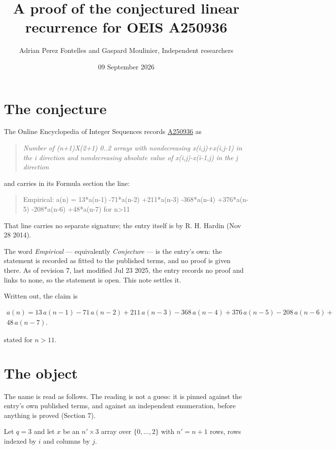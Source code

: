 \documentclass[11pt]{article}
\title{A proof of the conjectured linear recurrence for OEIS A250936}
\author{Adrian Perez Fontelles and Gaspard Moulinier, Independent researchers}
\date{09 September 2026}
\theoremstyle{definition}
\begin{document}
\maketitle
\section{The conjecture}

The Online Encyclopedia of Integer Sequences records \href{https://oeis.org/A250936}{A250936} as

\begin{quote}\itshape Number of (n+1)X(2+1) 0..2 arrays with nondecreasing x(i,j)+x(i,j-1) in the i direction and nondecreasing absolute value of x(i,j)-x(i-1,j) in the j direction\end{quote}

and carries in its Formula section the line:

\begin{quote}\ttfamily Empirical: a(n) = 13*a(n-1) -71*a(n-2) +211*a(n-3) -368*a(n-4) +376*a(n-5) -208*a(n-6) +48*a(n-7) for n>11\end{quote}

That line carries no separate signature; the entry itself is by R. H. Hardin (Nov 28 2014).

The word {\itshape Empirical} --- equivalently {\itshape Conjecture} --- is the entry's own: the statement is recorded as fitted to the published terms, and no proof is given there. As of revision 7, last modified Jul 23 2025, the entry records no proof and links to none, so the statement is open. This note settles it.

Written out, the claim is

\begin{multline*} a(n) = 13\,a(n-1) - 71\,a(n-2) + 211\,a(n-3) - 368\,a(n-4) + 376\,a(n-5) - 208\,a(n-6) + \\ 48\,a(n-7). \end{multline*}

stated for $n > 11$.

\section{The object}

The name is read as follows. The reading is not a guess: it is pinned against the entry's own published terms, and against an independent enumeration, before anything is proved (Section 7).

Let $q = 3$ and let $x$ be an $n' \times 3$ array over $\{0,\dots,2\}$ with $n' = n + 1$ rows, rows indexed by $i$ and columns by $j$.
\end{document}
